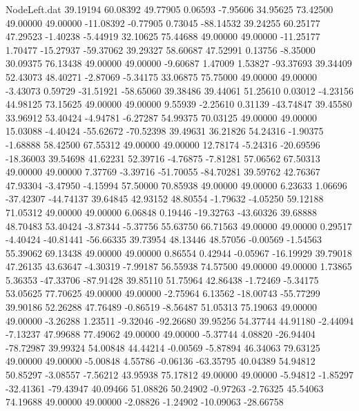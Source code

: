\begin{filecontents}{NodeLeft.dat}
  39.19194   60.08392   49.77905     0.06593   -7.95606   34.95625   73.42500   49.00000   49.00000  -11.08392   -0.77905    0.73045  -88.14532
  39.24255   60.25177   47.29523    -1.40238   -5.44919   32.10625   75.44688   49.00000   49.00000  -11.25177    1.70477  -15.27937  -59.37062
  39.29327   58.60687   47.52991     0.13756   -8.35000   30.09375   76.13438   49.00000   49.00000   -9.60687    1.47009    1.53827  -93.37693
  39.34409   52.43073   48.40271    -2.87069   -5.34175   33.06875   75.75000   49.00000   49.00000   -3.43073    0.59729  -31.51921  -58.65060
  39.38486   39.44061   51.25610     0.03012   -4.23156   44.98125   73.15625   49.00000   49.00000    9.55939   -2.25610    0.31139  -43.74847
  39.45580   33.96912   53.40424    -4.94781   -6.27287   54.99375   70.03125   49.00000   49.00000   15.03088   -4.40424  -55.62672  -70.52398
  39.49631   36.21826   54.24316    -1.90375   -1.68888   58.42500   67.55312   49.00000   49.00000   12.78174   -5.24316  -20.69596  -18.36003
  39.54698   41.62231   52.39716    -4.76875   -7.81281   57.06562   67.50313   49.00000   49.00000    7.37769   -3.39716  -51.70055  -84.70281
  39.59762   42.76367   47.93304    -3.47950   -4.15994   57.50000   70.85938   49.00000   49.00000    6.23633    1.06696  -37.42307  -44.74137
  39.64845   42.93152   48.80554    -1.79632   -4.05250   59.12188   71.05312   49.00000   49.00000    6.06848    0.19446  -19.32763  -43.60326
  39.68888   48.70483   53.40424    -3.87344   -5.37756   55.63750   66.71563   49.00000   49.00000    0.29517   -4.40424  -40.81441  -56.66335
  39.73954   48.13446   48.57056    -0.00569   -1.54563   55.39062   69.13438   49.00000   49.00000    0.86554    0.42944   -0.05967  -16.19929
  39.79018   47.26135   43.63647    -4.30319   -7.99187   56.55938   74.57500   49.00000   49.00000    1.73865    5.36353  -47.33706  -87.91428
  39.85110   51.75964   42.86438    -1.72469   -5.34175   53.05625   77.70625   49.00000   49.00000   -2.75964    6.13562  -18.00743  -55.77299
  39.90186   52.26288   47.76489    -0.86519   -8.56487   51.05313   75.19063   49.00000   49.00000   -3.26288    1.23511   -9.32046  -92.26680
  39.95256   54.37744   44.91180    -2.44094   -7.13237   47.99688   77.49062   49.00000   49.00000   -5.37744    4.08820  -26.94404  -78.72987
  39.99324   54.00848   44.44214    -0.00569   -5.87894   46.34063   79.63125   49.00000   49.00000   -5.00848    4.55786   -0.06136  -63.35795
  40.04389   54.94812   50.85297    -3.08557   -7.56212   43.95938   75.17812   49.00000   49.00000   -5.94812   -1.85297  -32.41361  -79.43947
  40.09466   51.08826   50.24902    -0.97263   -2.76325   45.54063   74.19688   49.00000   49.00000   -2.08826   -1.24902  -10.09063  -28.66758

\end{filecontents}
